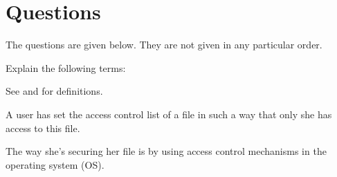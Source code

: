 \documentclass[svv,addpoints]{miunexam}
\begin{document}
\clearpage
\section*{Questions}
The questions are given below.
They are not given in any particular order.

\begin{questions}

  \question\label{q:terminology}
  Explain the following terms:
  \begin{solution}
    See \cite{Gollmann2011cs} and \cite{Anderson2008sea} for definitions.
  \end{solution}


  \question\label{q:non-repudiation}
  A user has set the access control list of a file in such a way that only she 
  has access to this file.
  \begin{solution}
    The way she's securing her file is by using access control mechanisms in 
    the operating system (OS).


\end{solution}
\end{questions}
\end{document}
